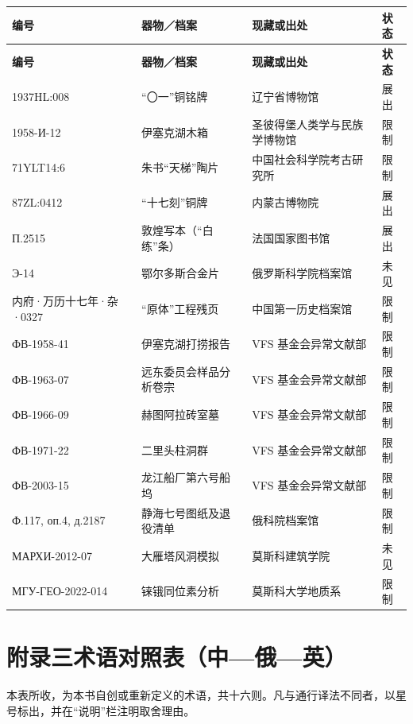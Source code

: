 \vspace{2mm}
{\footnotesize
\renewcommand{\arraystretch}{1.0}
\begin{longtable}{@{}p{27mm}p{40mm}p{36mm}p{24mm}@{}}
\toprule
\textbf{编号} & \textbf{器物／档案} & \textbf{现藏或出处} & \textbf{状态}\\
\midrule
\endfirsthead
\toprule
\textbf{编号} & \textbf{器物／档案} & \textbf{现藏或出处} & \textbf{状态}\\
\midrule
\endhead
\bottomrule
\endfoot
1937HL:008 & “〇一”铜铭牌 & 辽宁省博物馆 & 展出\\
1958-И-12 & 伊塞克湖木箱 & 圣彼得堡人类学与民族学博物馆 & 限制\\
71YLT14:6 & 朱书“天梯”陶片 & 中国社会科学院考古研究所 & 限制\\
87ZL:0412 & “十七刻”铜牌 & 内蒙古博物院 & 展出\\
П.2515 & 敦煌写本（“白练”条） & 法国国家图书馆 & 展出\\
Э-14 & 鄂尔多斯合金片 & 俄罗斯科学院档案馆 & 未见\\
内府·万历十七年·杂·0327 & “原体”工程残页 & 中国第一历史档案馆 & 限制\\
ФВ-1958-41 & 伊塞克湖打捞报告 & VFS 基金会异常文献部 & 限制\\
ФВ-1963-07 & 远东委员会样品分析卷宗 & VFS 基金会异常文献部 & 限制\\
ФВ-1966-09 & 赫图阿拉砖室墓 & VFS 基金会异常文献部 & 限制\\
ФВ-1971-22 & 二里头柱洞群 & VFS 基金会异常文献部 & 限制\\
ФВ-2003-15 & 龙江船厂第六号船坞 & VFS 基金会异常文献部 & 限制\\
Ф.117, оп.4, д.2187 & 静海七号图纸及退役清单 & 俄科院档案馆 & 限制\\
МАРХИ-2012-07 & 大雁塔风洞模拟 & 莫斯科建筑学院 & 未见\\
МГУ-ГЕО-2022-014 & 铼锇同位素分析 & 莫斯科大学地质系 & 限制\\
\bottomrule
\end{longtable}
}

\clearpage
\chapter*{附录三\quad 术语对照表（中—俄—英）}

本表所收，为本书自创或重新定义的术语，共十六则。凡与通行译法不同者，以星号标出，并在“说明”栏注明取舍理由。

